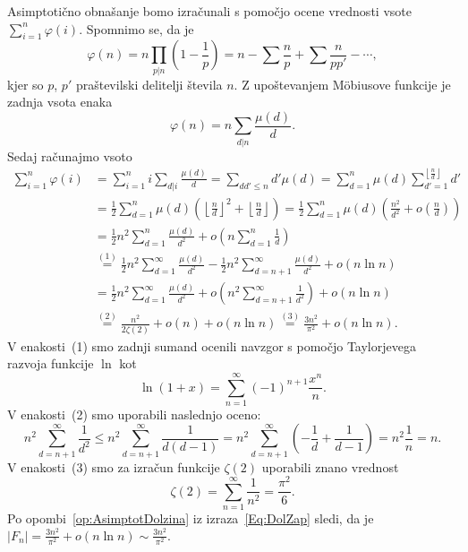 \documentclass[mat1]{fmfdelo}
\begin{document}
\begin{dokaz}
Asimptotično obnašanje bomo izračunali s pomočjo ocene vrednosti vsote \( \sum_{i=1}^n \varphi(i) \).
Spomnimo se, da je 
\[ \varphi(n) = n \prod_{p|n} \left (1 - \frac{1}{p} \right ) = n - \sum \frac{n}{p} + \sum \frac{n}{pp'} - \cdots , \]
kjer so $p$, $p'$ praštevilski delitelji števila $n$.  Z upoštevanjem M\"obiusove funkcije je zadnja vsota enaka
\[ \varphi(n) = n \sum_{d|n} \frac{\mu(d)}{d} .\]
Sedaj računajmo vsoto 
%
\begin{align}
\label{Eq:DolZap}
\sum_{i=1}^n \varphi(i)
  &= \sum_{i=1}^n i \sum_{d|i} \frac{\mu(d)}{d} = \sum_{dd'\leq n}d' \mu(d) = 
    \sum_{d=1}^n \mu(d) \sum_{d'=1}^{\left \lfloor \frac{n}{d} \right \rfloor} d' \nonumber \\
  &= \frac{1}{2} \sum_{d=1}^{n} \mu(d) \left (\left \lfloor \frac{n}{d} \right \rfloor ^2 + \left \lfloor \frac{n}{d} \right \rfloor \right) =
    \frac{1}{2} \sum_{d=1}^{n} \mu(d) \left (\frac{n^2}{d^2} + o \left (\frac{n}{d} \right) \right) \nonumber \\
  &= \frac{1}{2}n^2 \sum_{d=1}^{n} \frac{\mu(d)}{d^2} + o \left (n \sum_{d=1}^{n} \frac{1}{d} \right ) \nonumber \\
  &\stackrel{(1)}{=} \frac{1}{2}n^2 \sum_{d=1}^{\infty} \frac{\mu(d)}{d^2} - \frac{1}{2}n^2 \sum_{d=n+1}^{\infty} \frac{\mu(d)}{d^2} + o(n \ln{n}) \nonumber \\
  &= \frac{1}{2}n^2 \sum_{d=1}^{\infty} \frac{\mu(d)}{d^2} + o \left (n^2\sum_{d=n+1}^{\infty} \frac{1}{d^2} \right ) + o(n \ln{n}) \nonumber \\
  & \stackrel{(2)}{=} \frac{n^2}{2 \zeta(2)} + o(n) + o(n \ln{n}) \stackrel{(3)}{=} \frac{3n^2}{\pi^2} + o(n \ln{n}).
\end{align}
%
V enakosti~(1) smo zadnji sumand ocenili navzgor s pomočjo Taylorjevega razvoja funkcije $\ln$ kot
\[ \ln{(1+x)} = \sum_{n=1}^{\infty} (-1)^{n+1} \frac{x^n}{n}.\]
%
V enakosti~(2) smo uporabili naslednjo oceno:
\[ n^2 \sum_{d=n+1}^{\infty} \frac{1}{d^2} \leq n^2 \sum_{d=n+1}^{\infty} \frac{1}{d(d-1)} = 
n^2 \sum_{d=n+1}^{\infty} \left (- \frac{1}{d} + \frac{1}{d-1} \right ) = n^2 \frac{1}{n} = n.\]
%
V enakosti~(3) smo za izračun funkcije $\zeta(2)$ uporabili znano vrednost
\[ \zeta(2) = \sum_{n=1}^{\infty} \frac{1}{n^2} = \frac{\pi^2}{6}.\]
%
Po opombi~\ref{op:AsimptotDolzina} iz izraza~\eqref{Eq:DolZap} sledi, da je \(|F_n| = \frac{3n^2}{\pi^2} + o(n \ln{n}) \sim\frac{3n^2}{\pi^2}. \)
\end{dokaz}

%
\end{document}
